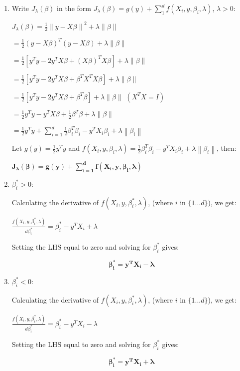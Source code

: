 \documentclass{article}
\newcommand{\norm}[1]{\left\lVert#1\right\rVert}
\begin{document}
\begin{enumerate}
\setlength\itemsep{1em}

\item Write $J_\lambda(\beta)$ in the form $J_\lambda(\beta)=g(y)+\sum_1^df(X_i,y,\beta_i,\lambda)$, $\lambda > 0$: 

$J_\lambda(\beta)=\frac{1}{2}\norm{y-X\beta}^2+\lambda\norm{\beta}$ 

$=\frac{1}{2}(y-X\beta)^T(y-X\beta)+\lambda\norm{\beta}$ 

$=\frac{1}{2}[y^Ty-2y^TX\beta+(X\beta)^TX\beta]+\lambda\norm{\beta}$ 

$=\frac{1}{2}[y^Ty-2y^TX\beta+\beta^TX^TX\beta]+\lambda\norm{\beta}$ 

$=\frac{1}{2}[y^Ty-2y^TX\beta+\beta^T\beta]+\lambda\norm{\beta}$ \hfill $(X^TX=I)$ 

$=\frac{1}{2}y^Ty-y^TX\beta+\frac{1}{2}\beta^T\beta+\lambda\norm{\beta}$ 

$=\frac{1}{2}y^Ty+\sum_{i=1}^d\frac{1}{2}\beta_i^T\beta_i-y^TX_i\beta_i+\lambda\norm{\beta_i}$ 

Let $g(y)=\frac{1}{2}y^Ty$ and $f(X_i,y,\beta_i,\lambda)=\frac{1}{2}\beta_i^T\beta_i-y^TX_i\beta_i+\lambda\norm{\beta_i}$, then: 

$\bm{J_\lambda(\beta)=g(y)+\sum_{i=1}^df(X_i,y,\beta_i,\lambda)}$ 



\item $\beta_i^\ast>0$:

Calculating the derivative of $f(X_i,y,\beta_i^\ast,\lambda)$, (where $i$ in $\{1...d\}$), we get: 

$\frac{f(X_i,y,\beta_i^\ast,\lambda)}{d\beta_i^\ast}=\beta_i^\ast-y^TX_i+\lambda$

Setting the LHS equal to zero and solving for $\beta_i^\ast$ gives:

\begin{equation}
\bm{\beta_i^\ast=y^TX_i-\lambda}
\end{equation}


\item $\beta_i^\ast<0$:

Calculating the derivative of $f(X_i,y,\beta_i^\ast,\lambda)$, (where $i$ in $\{1...d\}$), we get: 

$\frac{f(X_i,y,\beta_i^\ast,\lambda)}{d\beta_i^\ast}=\beta_i^\ast-y^TX_i-\lambda$

Setting the LHS equal to zero and solving for $\beta_i^\ast$ gives:

\begin{equation}
\bm{\beta_i^\ast=y^TX_i+\lambda}
\end{equation}


\end{enumerate}
\end{document}
